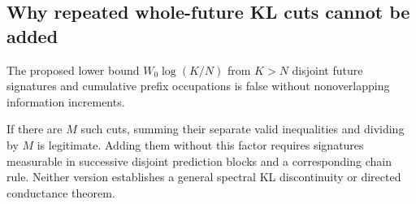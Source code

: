 \subsection{Why repeated whole-future KL cuts cannot be added}
\begin{proposition}
\label{II:U:prop:repeated-kl-cuts}
The proposed lower bound $W_0\log(K/N)$ from $K>N$ disjoint future
signatures and cumulative prefix occupations is false without
nonoverlapping information increments.
\end{proposition}

If there are $M$ such cuts, summing their separate valid inequalities
and dividing by $M$ is legitimate. Adding them without this factor
requires signatures measurable in successive disjoint prediction
blocks and a corresponding chain rule. Neither version establishes
a general spectral KL discontinuity or directed conductance theorem.
